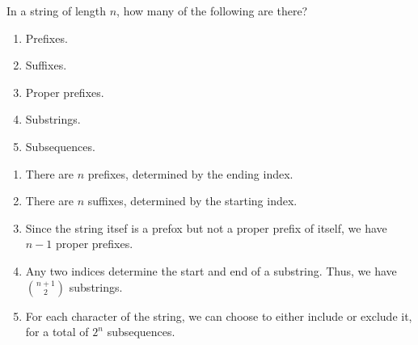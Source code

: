 \begin{exercise}\label{ex:030303}
    In a string of length $n$, how many of the following are there?
    \begin{enumerate}[label=\alph*)]
        \item Prefixes.
        \item Suffixes.
        \item Proper prefixes.
        \item Substrings.
        \item Subsequences.
    \end{enumerate}
\end{exercise}
\begin{solution}\label{sol:030303}
    \begin{enumerate}[label=\alph*)]
        \item There are $n$ prefixes, determined by the ending index.
        \item There are $n$ suffixes, determined by the starting index.
        \item Since the string itsef is a prefox but not a proper prefix of 
        itself, we have $n-1$ proper prefixes.
        \item Any two indices determine the start and end of a substring. 
        Thus, we have $\binom{n+1}{2}$ substrings.
        \item For each character of the string, we can choose to either include
        or exclude it, for a total of $2^n$ subsequences.
    \end{enumerate}
\end{solution}